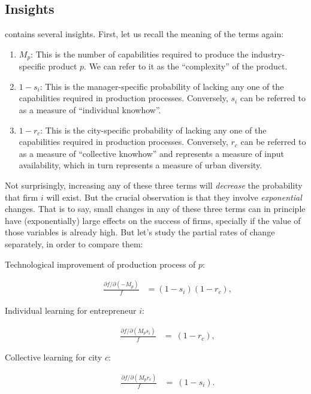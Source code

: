 \documentclass[12pt]{article}
\begin{document}
\subsection{Insights}
 contains several insights. First, let us recall the meaning of the terms again:
\begin{enumerate}
	\item $M_p$: This is the number of capabilities required to produce the industry-specific product $p$. We can refer to it as the ``complexity'' of the product.
	\item $1-s_i$: This is the manager-specific probability of lacking any one of the capabilities required in production processes. Conversely, $s_i$ can be referred to as a measure of ``individual knowhow''.
	\item $1-r_c$: This is the city-specific probability of lacking any one of the capabilities required in production processes. Conversely, $r_c$ can be referred to as a measure of ``collective knowhow'' and represents a measure of input availability, which in turn represents a measure of urban diversity.	
\end{enumerate}
Not surprisingly, increasing any of these three terms will \emph{decrease} the probability that firm $i$ will exist. But the crucial observation is that they involve \emph{exponential} changes. That is to say, small changes in any of these three terms can in principle have (exponentially) large effects on the success of firms, specially if the value of those variables is already high. But let's study the partial rates of change separately, in order to compare them:
\begin{description}
	\item[Technological improvement of production process of $p$:]
	\begin{align}
		\frac{\partial f/\partial (-M_p)}{f}&= (1-s_i)(1-r_c), \label{eq_Mp}
	\end{align}
	
	\item[Individual learning for entrepreneur $i$:]
	\begin{align}
		\frac{\partial f/\partial (M_p s_i)}{f}&= ~ (1-r_c), \label{eq_si}
	\end{align}
	
	\item[Collective learning for city $c$:]
	\begin{align}
		\frac{\partial f/\partial (M_p r_c)}{f}&= ~ (1-s_i) \label{eq_rc}.
	\end{align}
\end{description}
\end{document}
